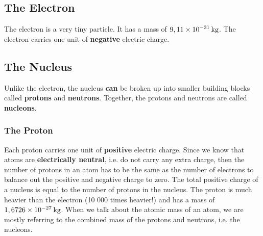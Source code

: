             \subsection*{The Electron}
            \nopagebreak
        \label{m38745*id255241}The electron is a very tiny particle. It has a mass of $9,11\ensuremath{\times}{10}^{-31}\phantom{\rule{2pt}{0ex}}\text{kg}$.
 The electron carries one unit of \textbf{negative} electric charge.\par
      \label{m38745*uid11}
            \subsection*{The Nucleus}
            \nopagebreak
        \label{m38745*id255305}Unlike the electron, the nucleus \textbf{can} be broken up into smaller building
blocks called \textbf{protons} and \textbf{neutrons}. Together, the protons and
neutrons are called \textbf{nucleons}.\par 
        \label{m38745*uid12}
            \subsubsection*{The Proton}
            \nopagebreak
          \label{m38745*id255338}Each proton carries one unit of \textbf{positive} electric charge.
Since we know that atoms are
\textbf{electrically neutral}, i.e. do not carry any extra charge, then the number
of protons in an atom has to be the same as the number of electrons to balance
out the positive and negative charge to zero. The total positive charge of a
nucleus is equal to the number of protons in the nucleus. The proton is much heavier
than the electron (10 000 times heavier!) and has a mass of $1,6726\ensuremath{\times}{10}^{-27}\phantom{\rule{2pt}{0ex}}\text{kg}$. When we talk about the atomic mass of an atom, we are mostly referring to the combined mass of the protons and neutrons, i.e. the nucleons.\par 
        \label{m38745*uid13}
